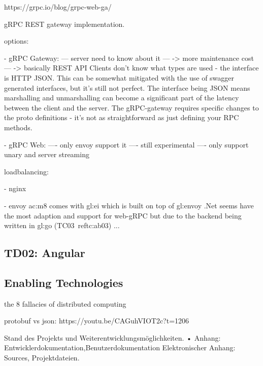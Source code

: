 https://grpc.io/blog/grpc-web-ga/

gRPC REST gateway implementation.

options:

- gRPC Gateway:
--- server need to know about it
--- -> more maintenance cost
--- -> basically REST API
Clients don’t know what types are used - the interface is HTTP JSON. This can be somewhat mitigated with the use of swagger generated interfaces, but it’s still not perfect.
The interface being JSON means marshalling and unmarshalling can become a significant part of the latency between the client and the server.
The gRPC-gateway requires specific changes to the proto definitions - it’s not as straightforward as just defining your RPC methods.

- gRPC Web: 
---- only envoy support it
---- still experimental
---- only support unary and server streaming

loadbalancing:

- nginx

- envoy
\gls{ac:m8} comes with \gls{gl:ei} which is built on top of \gls{gl:envoy}
.Net seems have the most adaption and support for web-gRPC but due to the backend being written in \gls{gl:go} (TC03~ref{tc:ab03}) ...

\subsection{TD02: Angular}

\subsection{Enabling Technologies}

the 8 fallacies of distributed computing

protobuf vs json: https://youtu.be/CAGuhVIOT2c?t=1206

Stand des Projekts und Weiterentwicklungsmöglichkeiten.
• Anhang: Entwicklerdokumentation,Benutzerdokumentation
Elektronischer Anhang: Sources, Projektdateien.